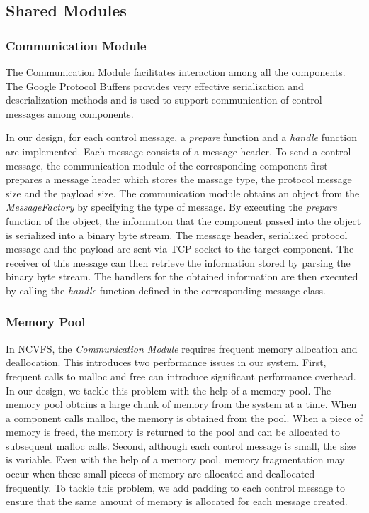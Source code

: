 \documentclass{article}
\begin{document}
\subsection{Shared Modules}

\subsubsection{Communication Module}

The Communication Module facilitates interaction among all the components. The Google Protocol Buffers 
provides very effective serialization and deserialization methods and is used to support communication 
of control messages among components.

In our design, for each control message, a \textit{prepare} function and a \textit{handle} function are implemented.
Each message consists of a message header. 
To send a control message, the communication module of the corresponding component first prepares a 
message header which stores the massage type, the protocol message size and the payload size. The 
communication module obtains an object from the \textit{MessageFactory} by specifying the type of 
message. By executing the \textit{prepare} function of the object, the information that the component 
passed into the object is serialized into a binary byte stream. 
The message header, serialized protocol message and the payload are sent via TCP socket to the target component. 
The receiver of this message can then 
retrieve the information stored by parsing the binary byte stream. The handlers for the obtained information are
then executed by calling the \textit{handle} function defined in the corresponding message class.

\subsubsection{Memory Pool}

In NCVFS, the \textit{Communication Module} requires frequent memory allocation and deallocation. 
This introduces two performance issues in our system. First, frequent calls to malloc and free 
can introduce significant performance overhead. In our design, we tackle this problem with the
help of a memory pool. The memory pool obtains a large chunk of memory from the system at a time. 
When a component calls malloc, the memory is obtained from the pool. When a piece of memory is freed,
the memory is returned to the pool and can be allocated to subsequent malloc calls. Second, although
each control message is small, the size is variable. Even with the help of a memory pool, 
memory fragmentation may occur when these small pieces of memory are allocated and deallocated frequently. 
To tackle this problem, we add padding to each control message to ensure that the same amount of memory is
allocated for each message created.
\end{document}
